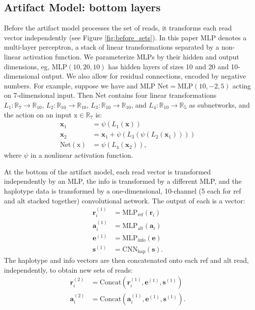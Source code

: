 \documentclass[times, twoside, watermark]{StyleBioRxiv}
\begin{document}
\subsection*{Artifact Model: bottom layers} 
Before the artifact model processes the set of reads, it transforms each read vector independently (see Figure \ref{fig:before_sets}).  In this paper $\mathrm{MLP}$ denotes a multi-layer perceptron, a stack of linear transformations separated by a non-linear activation function.  We parameterize MLPs by their hidden and output dimensions, eg, $\mathrm{MLP}(10,20,10)$ has hidden layers of sizes 10 and 20 and 10-dimensional output.  We also allow for residual connections, encoded by negative numbers.  For example, suppose we have and MLP $\mathrm{Net} = \mathrm{MLP}(10, -2, 5)$ acting on 7-dimensional input.  Then $\mathrm{Net}$ contains four linear transformations $L_1 : \mathbb{R}_7 \rightarrow \mathbb{R}_{10}$, $L_2 : \mathbb{R}_{10} \rightarrow \mathbb{R}_{10}$, $L_3 : \mathbb{R}_{10} \rightarrow \mathbb{R}_{10}$, and $L_4 : \mathbb{R}_{10} \rightarrow \mathbb{R}_{5}$ as subnetworks, and the action on an input $\mathrm{x} \in \mathbb{R}_7$ is:
\begin{align}
    \mathbf{x}_1 & = \psi(L_1(\mathbf{x})) \\
    \mathbf{x}_2 & = \mathbf{x}_1 + \psi(L_3(\psi(L_2(\mathbf{x}_1)))) \\
    \mathrm{Net}(\mathrm{x}) & = \psi(L_4(\mathbf{x}_2)),    
\end{align}
where $\psi$ in a nonlinear activation function.

At the bottom of the artifact model, each read vector is transformed independently by an MLP, the info is transformed by a different MLP, and the haplotype data is transformed by a one-dimensional, 10-channel (5 each for ref and alt stacked together) convolutional network.  The output of each is a vector:
\begin{align}
    \mathbf{r}_i^{(1)} &= \mathrm{MLP}_\mathrm{ref} (\mathbf{r}_i) \\
    \mathbf{a}_i^{(1)} &= \mathrm{MLP}_\mathrm{alt} (\mathbf{a}_i) \\
    \mathbf{e}^{(1)} &= \mathrm{MLP}_\mathrm{info} (\mathbf{e}) \\
    \mathbf{s}^{(1)} &= \mathrm{CNN}_\mathrm{hap} (\mathbf{s}).
\end{align}
The haplotype and info vectors are then concatenated onto each ref and alt read, independently, to obtain new sets of reads:
\begin{align}
    \mathbf{r}_i^{(2)} &= \mathrm{Concat}\left( \mathbf{r}_i^{(1)}, \mathbf{e}^{(1)}, \mathbf{s}^{(1)} \right) \\
    \mathbf{a}_i^{(2)} &= \mathrm{Concat}\left( \mathbf{a}_i^{(1)}, \mathbf{e}^{(1)}, \mathbf{s}^{(1)} \right).
\end{align}
\end{document}
